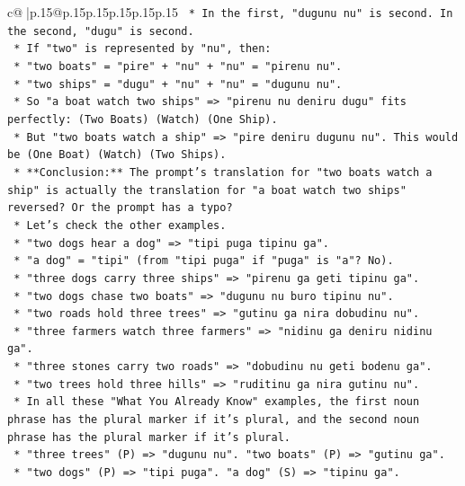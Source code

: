\documentclass{article}
\begin{document}
{\begin{supertabular}{c@{$\;$}|p{.15\linewidth}@{}p{.15\linewidth}p{.15\linewidth}p{.15\linewidth}p{.15\linewidth}p{.15\linewidth}}
{{{\texttt{        *   In the first, "dugunu nu" is second. In the second, "dugu" is second.} \\
\texttt{        *   If "two" is represented by "nu", then:} \\
\texttt{            *   "two boats" = "pire" + "nu" + "nu" = "pirenu nu".} \\
\texttt{            *   "two ships" = "dugu" + "nu" + "nu" = "dugunu nu".} \\
\texttt{        *   So "a boat watch two ships" => "pirenu nu deniru dugu" fits perfectly: (Two Boats) (Watch) (One Ship).} \\
\texttt{        *   But "two boats watch a ship" => "pire deniru dugunu nu". This would be (One Boat) (Watch) (Two Ships).} \\
\texttt{        *   **Conclusion:** The prompt's translation for "two boats watch a ship" is actually the translation for "a boat watch two ships" reversed? Or the prompt has a typo?} \\
\texttt{        *   Let's check the other examples.} \\
\texttt{        *   "two dogs hear a dog" => "tipi puga tipinu ga".} \\
\texttt{        *   "a dog" = "tipi" (from "tipi puga" if "puga" is "a"? No).} \\
\texttt{        *   "three dogs carry three ships" => "pirenu ga geti tipinu ga".} \\
\texttt{        *   "two dogs chase two boats" => "dugunu nu buro tipinu nu".} \\
\texttt{        *   "two roads hold three trees" => "gutinu ga nira dobudinu nu".} \\
\texttt{        *   "three farmers watch three farmers" => "nidinu ga deniru nidinu ga".} \\
\texttt{        *   "three stones carry two roads" => "dobudinu nu geti bodenu ga".} \\
\texttt{        *   "two trees hold three hills" => "ruditinu ga nira gutinu nu".} \\
\texttt{        *   In all these "What You Already Know" examples, the first noun phrase has the plural marker if it's plural, and the second noun phrase has the plural marker if it's plural.} \\
\texttt{        *   "three trees" (P) => "dugunu nu". "two boats" (P) => "gutinu ga".} \\
\texttt{        *   "two dogs" (P) => "tipi puga". "a dog" (S) => "tipinu ga".} \\
}}}
\end{supertabular}}
\end{document}
